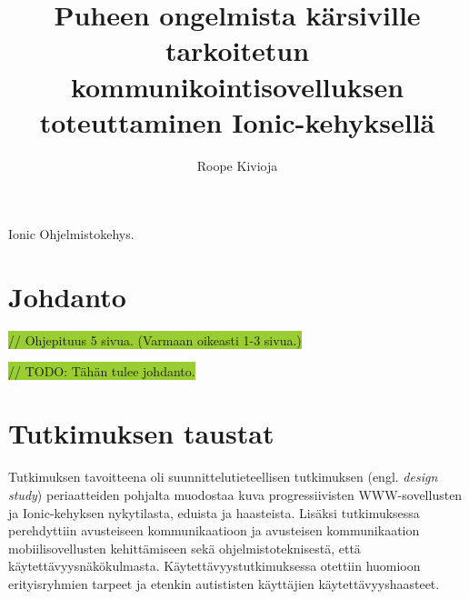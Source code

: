 \documentclass[utf8]{gradu3}
\begin{document}
\title{Puheen ongelmista kärsiville tarkoitetun kommunikointisovelluksen toteuttaminen Ionic-kehyksellä}

\author{Roope Kivioja}


\maketitle

\begin{thetermlist}
\item[Ionic] Ohjelmistokehys.
\end{thetermlist}

\mainmatter

\chapter{Johdanto}

\colorbox{YellowGreen}{// Ohjepituus 5 sivua. (Varmaan oikeasti 1-3 sivua.)}

\colorbox{YellowGreen}{// TODO: Tähän tulee johdanto.}

\chapter{Tutkimuksen taustat}

Tutkimuksen tavoitteena oli suunnittelutieteellisen tutkimuksen (engl. \textit{design study}) periaatteiden pohjalta muodostaa kuva progressiivisten WWW-sovellusten ja Ionic-kehyksen nykytilasta, eduista ja haasteista. Lisäksi tutkimuksessa perehdyttiin avusteiseen kommunikaatioon ja avusteisen kommunikaation mobiilisovellusten kehittämiseen sekä ohjelmistoteknisestä, että käytettävyysnäkökulmasta. Käytettävyystutkimuksessa otettiin huomioon erityisryhmien tarpeet ja etenkin autististen käyttäjien käytettävyyshaasteet.
\end{document}
